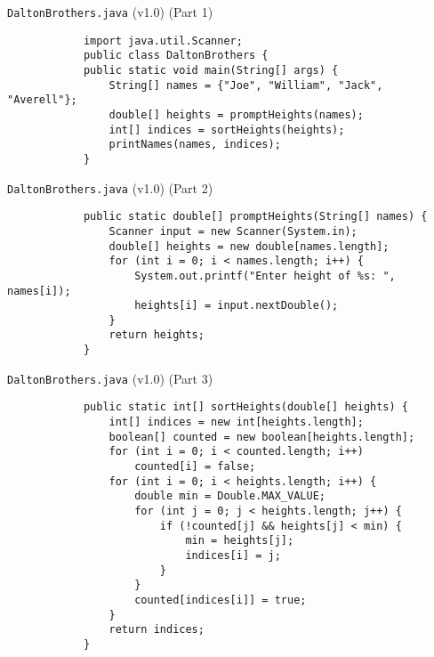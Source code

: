 \documentclass[10pt, compress]{beamer}
\begin{document}
\begin{slide}
	\begin{block}{\texttt{DaltonBrothers.java} (v1.0) (Part 1)}
		\begin{verbatim}
			import java.util.Scanner;
			public class DaltonBrothers {
			public static void main(String[] args) {
			    String[] names = {"Joe", "William", "Jack", "Averell"};
			    double[] heights = promptHeights(names);
			    int[] indices = sortHeights(heights);
			    printNames(names, indices);
			}
		\end{verbatim}
	\end{block}
\end{slide}

\begin{slide}
	\begin{block}{\texttt{DaltonBrothers.java} (v1.0) (Part 2)}
		\begin{verbatim}
			public static double[] promptHeights(String[] names) {
			    Scanner input = new Scanner(System.in);
			    double[] heights = new double[names.length];
			    for (int i = 0; i < names.length; i++) {
			        System.out.printf("Enter height of %s: ", names[i]);
			        heights[i] = input.nextDouble();
			    }
			    return heights;
			}
		\end{verbatim}
	\end{block}
\end{slide}

\begin{slide}
	\begin{block}{\texttt{DaltonBrothers.java} (v1.0) (Part 3)}
		\begin{verbatim}
			public static int[] sortHeights(double[] heights) {
			    int[] indices = new int[heights.length];
			    boolean[] counted = new boolean[heights.length];
			    for (int i = 0; i < counted.length; i++)
			        counted[i] = false;
			    for (int i = 0; i < heights.length; i++) {
			        double min = Double.MAX_VALUE;
			        for (int j = 0; j < heights.length; j++) {
			            if (!counted[j] && heights[j] < min) {
			                min = heights[j];
			                indices[i] = j;
			            }
			        }
			        counted[indices[i]] = true;
			    }
			    return indices;
			}
		\end{verbatim}
	\end{block}
\end{slide}
\end{document}
